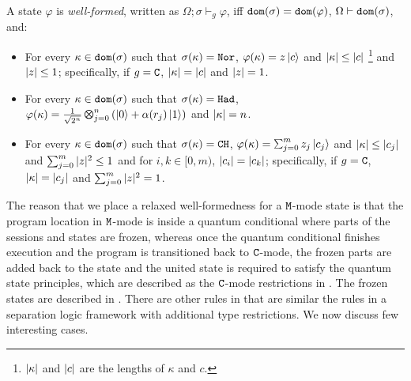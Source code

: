 \begin{definition}\label{def:well-formed}\rm 
  A state $\varphi$ is \emph{well-formed}, written as
  $\Omega;\sigma \vdash_g \varphi$, iff $\mathtt{dom}(\sigma) = \mathtt{dom}(\varphi)$, $\Omega\vdash\mathtt{dom}(\sigma)$, and:
\begin{itemize}
\item For every $\kappa \in \mathtt{dom}(\sigma)$ such that $\sigma(\kappa) = \texttt{Nor}$, $\varphi(\kappa)=z\left\vert{c}\right\rangle$ and $|\kappa|\le |c|$ \footnote{$|\kappa|$ and $|c|$ are the lengths of $\kappa$ and $c$. } and $|z|\le 1$; specifically, if $g=\texttt{C}$,  $|\kappa| = |c|$ and $|z| = 1$.

\item For every $\kappa \in \mathtt{dom}(\sigma)$ such that $\sigma(\kappa) = \texttt{Had}$, $\varphi(\kappa)=\shad{2^n}{n}{\alpha(r_j)}$ and $|\kappa|=n$.

\item For every $\kappa \in \mathtt{dom}(\sigma)$ such that $\sigma(\kappa) = \texttt{CH}$, $\varphi(\kappa)=\sch{m}{z_j}{c_j}$ and $|\kappa|\le |c_j|$ and $\sum_{j=0}^m|z|^2\le 1$ and for $i,k\in [0,m)$, $|c_i|=|c_k|$;  specifically, if $g=\texttt{C}$,  $|\kappa| = |c_j|$ and $\sum_{j=0}^m|z|^2 = 1$.
\end{itemize}
\end{definition}

The reason that we place a relaxed well-formedness for a $\texttt{M}$-mode state is that the program location in $\texttt{M}$-mode is inside a quantum conditional where parts of the sessions and states are frozen, whereas once the quantum conditional finishes execution and the program is transitioned back to $\texttt{C}$-mode, the frozen parts are added back to the state and the united state is required to satisfy the quantum state principles, which are described as the $\texttt{C}$-mode restrictions in . The frozen states are described in .
There are other rules in  that are similar the rules in a separation logic framework with additional \qafny type restrictions. We now discuss few interesting cases.


